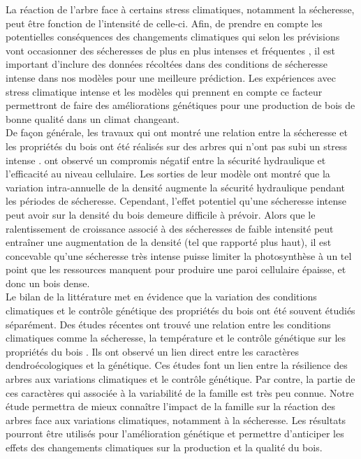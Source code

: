 \documentclass[a4paper,12pt]{report}
\begin{document}
La réaction de l'arbre face à certains stress climatiques, notamment la sécheresse, peut être fonction de l'intensité de celle-ci. Afin, de prendre en compte les potentielles conséquences des changements climatiques qui selon les prévisions vont occasionner des sécheresses de plus en plus intenses et fréquentes \citep{IPCC_2015}, il est important d'inclure des données récoltées dans des conditions de sécheresse intense dans nos modèles pour une meilleure prédiction. Les expériences avec stress climatique intense et les modèles qui prennent en compte ce facteur permettront de faire des améliorations génétiques pour une production de bois de bonne qualité dans un climat changeant.\\

De façon générale, les travaux qui ont montré une relation entre la sécheresse et les propriétés du bois ont été réalisés sur des arbres qui n'ont pas subi un stress intense \citep{Xu2012,Drew2009,Campelo2013,Jyske2009,Wilkinson2015}. \cite{Wilkinson2015} ont observé un compromis négatif entre la sécurité hydraulique et l'efficacité au niveau cellulaire. Les sorties de leur modèle ont montré que la variation intra-annuelle de la densité augmente la sécurité hydraulique pendant les périodes de sécheresse. Cependant, l'effet potentiel qu'une sécheresse intense peut avoir sur la densité du bois demeure difficile à prévoir. Alors que le ralentissement de croissance associé à des sécheresses de faible intensité peut entraîner une augmentation de la densité (tel que rapporté plus haut), il est concevable qu'une sécheresse très intense puisse limiter la photosynthèse à un tel point que les ressources manquent pour produire une paroi cellulaire épaisse, et donc un bois dense.\\ 

Le bilan de la littérature met en évidence que la variation des conditions climatiques et le contrôle génétique des propriétés du bois ont été souvent étudiés séparément. Des études récentes ont trouvé une relation entre les conditions climatiques comme la sécheresse, la température et le contrôle génétique sur les propriétés du bois \citep{Housset2018, Heer2018}. Ils ont observé un lien direct entre les caractères dendroécologiques et la génétique. Ces études font un lien entre la résilience des arbres aux variations climatiques et le contrôle génétique. Par contre, la partie de ces caractères qui associée à la variabilité de la famille est très peu connue. Notre étude permettra de mieux connaître l'impact de la famille sur la réaction des arbres face aux variations climatiques, notamment à la sécheresse. Les résultats pourront être utilisés pour l'amélioration génétique et permettre d'anticiper les effets des changements climatiques sur la production et la qualité du bois. \\
\end{document}
